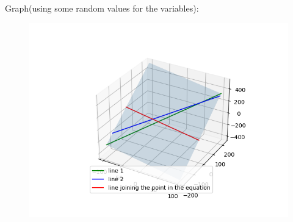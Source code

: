 \documentclass[journal,12pt,onecolumn]{IEEEtran}
\begin{document}
		Graph(using some random values for the variables):
\begin{figure}[h!]
	\centering
	\includegraphics[width=\linewidth]{img.png}
\end{figure}
\end{document}
